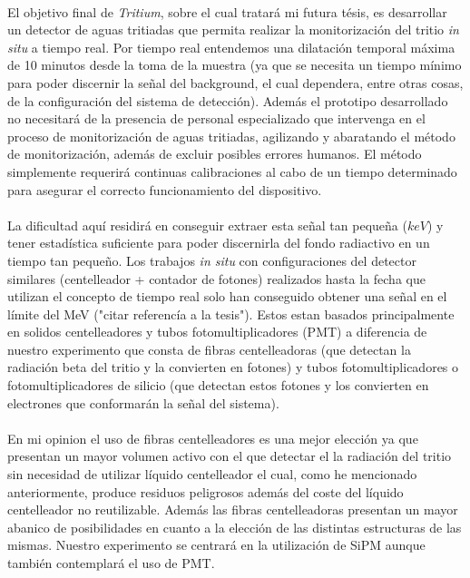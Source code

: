 \documentclass[11pt, a4paper]{article}
\begin{document}
\paragraph {}
El objetivo final de \textit{Tritium}, sobre el cual tratará mi futura tésis, es desarrollar un detector de aguas tritiadas que permita realizar la monitorización del tritio \textit{in situ} a tiempo real. Por tiempo real entendemos una dilatación temporal máxima de 10 minutos desde la toma de la muestra (ya que se necesita un tiempo mínimo para poder discernir la señal del background, el cual dependera, entre otras cosas, de la configuración del sistema de detección). Además el prototipo desarrollado no necesitará de la presencia de personal especializado que intervenga en el proceso de monitorización de aguas tritiadas, agilizando y abaratando el método de monitorización, además de excluir posibles errores humanos. El método simplemente requerirá continuas calibraciones al cabo de un tiempo determinado para asegurar el correcto funcionamiento del dispositivo. 

\paragraph {}
La dificultad aquí residirá en conseguir extraer esta señal tan pequeña ($keV$) y tener estadística suficiente para poder discernirla del fondo radiactivo en un tiempo tan pequeño. Los trabajos \textit{in situ} con configuraciones del detector similares (centelleador + contador de fotones) realizados hasta la fecha que utilizan el concepto de tiempo real solo han conseguido obtener una señal en el límite del MeV ("citar referencía a la tesis"). Estos estan basados principalmente en solidos centelleadores y tubos fotomultiplicadores (PMT) a diferencia de nuestro experimento que consta de fibras centelleadoras (que detectan la radiación beta del tritio y la convierten en fotones) y tubos fotomultiplicadores o fotomultiplicadores de silicio (que detectan estos fotones y los convierten en electrones que conformarán la señal del sistema). 

\paragraph {}
En mi opinion el uso de fibras centelleadores es una mejor elección ya que presentan un mayor volumen activo con el que detectar el la radiación del tritio  sin necesidad de utilizar líquido centelleador el cual, como he mencionado anteriormente, produce residuos peligrosos además del coste del líquido centelleador no reutilizable. Además las fibras centelleadoras presentan un mayor abanico de posibilidades en cuanto a la elección de las distintas estructuras de las mismas. Nuestro experimento se centrará en la utilización de SiPM aunque también contemplará el uso de PMT. 
\end{document}
